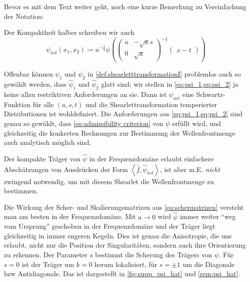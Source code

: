 Bevor es mit dem Text weiter geht, noch eine kurze Bemerkung zu Vereinfachung der Notation:

\begin{remark}[Notation]
    Der Kompaktheit halber schreiben wir auch
    \begin{equation*}
        \psi_{ast} (x_1,x_2) \coloneqq
        a^{-\frac{3}{4}} \psi\left(
    \left(\begin{smallmatrix}
        a & -\sqrt a s \\ 0 & \sqrt a
    \end{smallmatrix}\right)^{-1}
    \left(\begin{smallmatrix}
        x-t
    \end{smallmatrix}\right)
    \right)
    \end{equation*}
\end{remark}

Offenbar können $\psi_1$ und $\psi_2$ in \cref{def:shearletttransformationI} problemlos auch so gewählt werden, dass $\hat\psi_1$ und $\hat\psi_2$ glatt sind; wir stellen in \cref{eq:psi_1,eq:psi_2} ja keine allzu restriktiven Anforderungen an sie. Dann ist $\psi_{ast}$ eine Schwartz-Funktion für alle $(a,s,t)$ und die Shearlettransformation temperierter Distributionen ist wohldefiniert.  Die Anforderungen aus \cref{eq:psi_1,eq:psi_2} sind genau so gewählt, dass \cref{eq:admissibility criterion} von $\psi$ erfüllt wird, und gleichzeitig die konkreten Rechnungen zur Bestimmung der Wellenfrontmenge auch analytisch möglich sind.

Der kompakte Träger von $\hat\psi$ in der Frequenzdomäne erlaubt einfachere
Abschätzungen von Ausdrücken der Form $\left<\hat f, \hat \psi_{ast}\right>$, ist aber m.E. \emph{nicht} zwingend notwendig, um mit diesem Shearlet die Wellenfrontmenge zu bestimmen.


Die Wirkung der Scher- und Skalierungsmatrizen aus \cref{eq:schermatrizen} versteht man am besten in der Frequenzdomäne. Mit $a \to 0$ wird $\hat \psi$ immer weiter "`weg vom Ursprung"' geschoben in der Frequenzdomäne und der Träger liegt gleichzeitig in immer engeren Kegeln. Dies ist genau die Anisotropie, die uns erlaubt, nicht nur die Position der Singularitäten, sondern auch ihre Orientierung zu erkennen. Der Parameter $s$ bestimmt die Scherung des Trägers von $\psi$. Für $s=0$ ist der Träger um $k=0$ herum lokalisiert, für $s = \pm 1$ um die Diagonale bzw Antidiagonale. Das ist dargestellt in \cref{fig:supp_psi_hat} und \cref{rem:psi_hat}.


